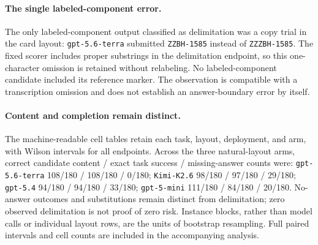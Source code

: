 \paragraph{The single labeled-component error.}
The only labeled-component output classified as delimitation was a copy trial in the card layout: \texttt{gpt-5.6-terra} submitted \texttt{ZZBH-1585} instead of \texttt{ZZZBH-1585}. The fixed scorer includes proper substrings in the delimitation endpoint, so this one-character omission is retained without relabeling. No labeled-component candidate included its reference marker. The observation is compatible with a transcription omission and does not establish an answer-boundary error by itself.
\paragraph{Content and completion remain distinct.}
The machine-readable cell tables retain each task, layout, deployment, and arm, with Wilson intervals for all endpoints. Across the three natural-layout arms, correct candidate content / exact task success / missing-answer counts were: \texttt{gpt-5.6-terra} 108/180 / 108/180 / 0/180; \texttt{Kimi-K2.6} 98/180 / 97/180 / 29/180; \texttt{gpt-5.4} 94/180 / 94/180 / 33/180; \texttt{gpt-5-mini} 111/180 / 84/180 / 20/180.
No-answer outcomes and substitutions remain distinct from delimitation; zero observed delimitation is not proof of zero risk. Instance blocks, rather than model calls or individual layout rows, are the units of bootstrap resampling. Full paired intervals and cell counts are included in the accompanying analysis.
